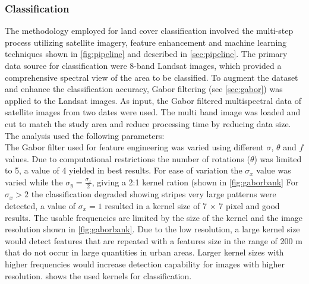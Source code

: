 \documentclass[12pt,a4paper, english,twoside]{scrartcl}
\begin{document}
    \subsubsection{Classification }\label{sec:classification}
      The methodology employed for land cover classification involved the multi-step process utilizing satellite imagery, feature enhancement and machine learning techniques shown in \cref{fig:pipeline} and described in \cref{sec:pipeline}.
      The primary data source for classification were 8-band Landsat images, which provided a comprehensive spectral view of the area to be classified.
      To augment the dataset and enhance the classification accuracy, Gabor filtering (see \cref{sec:gabor}) was applied to the Landsat images.
      As input, the Gabor filtered multispectral data of satellite images from two dates were used.
      The multi band image was loaded and cut to match the study area and reduce processing time by reducing data size.  \\
      The analysis used the following parameters: \\
      The Gabor filter used for feature engineering was varied using different $\sigma$, $\theta$ and $f$ values.
      Due to computational restrictions the number of rotations ($\theta$) was limited to 5, a value of 4 yielded in best results. 
      For ease of variation the $\sigma_x$ value was varied while the $\sigma_y = \frac{\sigma_x}{2}$, giving a 2:1 kernel ration (shown in \cref{fig:gaborbank} 
      For $\sigma_x > 2$ the classification degraded showing stripes very large patterns were detected, a value of $\sigma_x = 1$ resulted in a kernel size of 7 $\times$ 7 pixel and good results.
      The usable frequencies are limited by the size of the kernel and the image resolution shown in \cref{fig:gaborbank}.
      Due to the low resolution, a large kernel size would detect features that are repeated with a features size in the range of 200 m that do not occur in large quantities in urban areas. 
      Larger kernel sizes with higher frequencies would increase detection capability for images with higher resolution. 
     shows the used kernels for classification.
\end{document}
